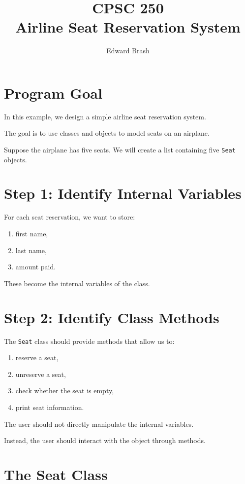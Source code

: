 \documentclass[11pt]{article}
\title{CPSC 250 \\ Airline Seat Reservation System}
\author{Edward Brash}
\date{}
\begin{document}
\maketitle

\section{Program Goal}

In this example, we design a simple airline seat reservation system.

The goal is to use classes and objects to model seats on an airplane.

Suppose the airplane has five seats. We will create a list containing five \texttt{Seat} objects.

\section{Step 1: Identify Internal Variables}

For each seat reservation, we want to store:

\begin{enumerate}
    \item first name,
    \item last name,
    \item amount paid.
\end{enumerate}

These become the internal variables of the class.

\section{Step 2: Identify Class Methods}

The \texttt{Seat} class should provide methods that allow us to:

\begin{enumerate}
    \item reserve a seat,
    \item unreserve a seat,
    \item check whether the seat is empty,
    \item print seat information.
\end{enumerate}

The user should not directly manipulate the internal variables.

Instead, the user should interact with the object through methods.

\section{The Seat Class}
\end{document}
